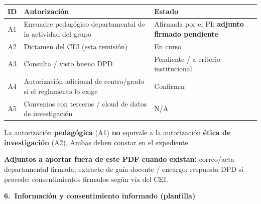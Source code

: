 \documentclass[11pt,a4paper]{scrartcl}
\newcommand{\AnnexTitle}[1]{%
  \clearpage
  \LogoRow
  \begin{center}{\Large\sffamily\bfseries #1}\end{center}
  \vspace{0.4em}
  \noindent{\color{rulegray}\hrule height 0.4pt}
  \vspace{0.5em}
}
\begin{document}
\renewcommand{\arraystretch}{1.25}
\begin{tabularx}{\textwidth}{@{}c>{\raggedright\arraybackslash}X>{\raggedright\arraybackslash}p{3.4cm}@{}}
  \toprule
  \textbf{ID} & \textbf{Autorización} & \textbf{Estado} \\
  \midrule
  A1 & Encuadre pedagógico departamental de la actividad del grupo & Afirmada por el PI; \textbf{adjunto firmado pendiente} \\
  A2 & Dictamen del CEI (esta remisión) & En curso \\
  A3 & Consulta / visto bueno DPD & Pendiente / a criterio institucional \\
  A4 & Autorización adicional de centro/grado si el reglamento lo exige & Confirmar \\
  A5 & Convenios con terceros / cloud de datos de investigación & N/A \\
  \bottomrule
\end{tabularx}

\vspace{0.5em}
\noindent
La autorización \textbf{pedagógica} (A1) \textbf{no} equivale a la autorización
\textbf{ética de investigación} (A2). Ambas deben constar en el expediente.

\noindent\textbf{Adjuntos a aportar fuera de este PDF cuando existan:}
correo/acta departamental firmada; extracto de guía docente / encargo;
respuesta DPD si procede; consentimientos firmados según vía del CEI.

\AnnexTitle{6.\ Información y consentimiento informado (plantilla)}

\end{document}
